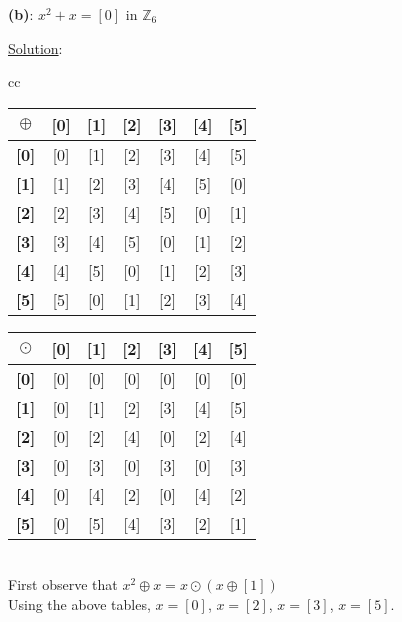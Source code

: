 \documentclass{article} %
\begin{document}
\textbf{(b)}: $x^2 + x = [0]$ in $\mathbb{Z}_6$
\\
\begin{addmargin}[1em]{0em}
\underline{Solution}: 
\begin{addmargin}[1em]{0em}
\begin{tabular}{cc}
\begin{tabular}{|c|c|c|c|c|c|c|}
\hline
\textbf{$\oplus$}&\textbf{[0]}&\textbf{[1]}&\textbf{[2]}&\textbf{[3]}&\textbf{[4]}&\textbf{[5]}\\ \hline
\textbf{[0]} & [0] & [1] & [2] & [3] & [4] & [5]\\ \hline
\textbf{[1]} & [1] & [2] & [3] & [4] & [5] & [0]\\ \hline
\textbf{[2]} & [2] & [3] & [4] & [5] & [0] & [1]\\ \hline
\textbf{[3]} & [3] & [4] & [5] & [0] & [1] & [2]\\ \hline
\textbf{[4]} & [4] & [5] & [0] & [1] & [2] & [3]\\ \hline
\textbf{[5]} & [5] & [0] & [1] & [2] & [3] & [4]\\ \hline
\end{tabular}

\quad

\begin{tabular}{|c|c|c|c|c|c|c|}
\hline
\textbf{$\odot$}&\textbf{[0]}&\textbf{[1]}&\textbf{[2]}&\textbf{[3]}&\textbf{[4]}&\textbf{[5]}\\ \hline
\textbf{[0]} & [0] & [0] & [0] & [0] & [0] & [0]\\ \hline
\textbf{[1]} & [0] & [1] & [2] & [3] & [4] & [5]\\ \hline
\textbf{[2]} & [0] & [2] & [4] & [0] & [2] & [4]\\ \hline
\textbf{[3]} & [0] & [3] & [0] & [3] & [0] & [3]\\ \hline
\textbf{[4]} & [0] & [4] & [2] & [0] & [4] & [2]\\ \hline
\textbf{[5]} & [0] & [5] & [4] & [3] & [2] & [1]\\ \hline
\end{tabular}
\end{tabular}
\\ \break First observe that $x^2 \oplus x = x\odot(x \oplus [1])$
\\Using the above tables, $x = [0]$, $x = [2]$, $x = [3]$, $x = [5]$.
\\
\end{addmargin}
\end{addmargin}
\end{document}
